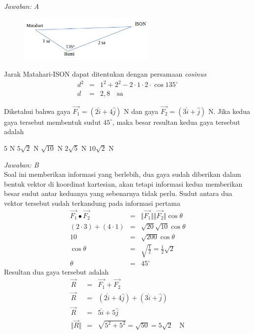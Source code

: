 \documentclass[11pt,fleqn, a4paper]{exam}
\begin{document}
\begin{questions}
\textit{Jawaban: A}
\begin{figure}[H]
\centering
\includegraphics[width=0.6\textwidth]{gambar/osk2016_11.png}
\end{figure}

Jarak Matahari-ISON dapat ditentukan dengan persamaan \textit{cosinus}
\begin{eqnarray*}
d^2 &=& 1^2 + 2^2 - 2 \cdot 1 \cdot 2 \cdot \cos{135^{\circ}}\\
d &=& 2,8 \quad \text{sa} 
\end{eqnarray*}

\vspace{0.5cm}
\question Diketahui bahwa gaya $\overrightarrow{F_1} = (2\hat{i} + 4\hat{j})$ N dan gaya $\overrightarrow{F_2} = (3\hat{i} + \hat{j})$ N. Jika kedua gaya tersebut membentuk sudut $45^{\circ}$, maka besar resultan kedua gaya tersebut adalah
\begin{choices}
\choice $5 $ N
\choice $5 \sqrt{2} $ N
\choice $\sqrt{10} $ N
\choice $2 \sqrt{5} $ N
\choice $10 \sqrt{2} $ N
\end{choices}

\textit{Jawaban: B}\\
Soal ini memberikan informasi yang berlebih, dua gaya sudah diberikan dalam bentuk vektor di koordinat kartesian, akan tetapi informasi kedua memberikan besar sudut antar keduanya yang sebenarnya tidak perlu.
Sudut antara dua vektor tersebut sudah terkandung pada informasi pertama
\begin{eqnarray*}
\overrightarrow{F_1} \bullet \overrightarrow{F_2} &=& \Vert \overrightarrow{F_1} \Vert \Vert \overrightarrow{F_2} \Vert \cos{\theta}\\
(2 \cdot 3) + (4 \cdot 1) &=& \sqrt{20} \sqrt{10} \cos{\theta}\\
10 &=& \sqrt{200} \cos{\theta}\\
\cos{\theta} &=& \sqrt{\frac{1}{2}} = \frac{1}{2} \sqrt{2}\\
\theta &=& 45^{\circ}
\end{eqnarray*}
Resultan dua gaya tersebut adalah
\begin{eqnarray*}
\overrightarrow{R} &=& \overrightarrow{F_1} + \overrightarrow{F_2}\\
\overrightarrow{R} &=& (2\hat{i} + 4\hat{j}) + (3\hat{i} + \hat{j})\\
\overrightarrow{R} &=& 5\hat{i} + 5\hat{j}\\
\Vert \overrightarrow{R} \Vert &=& \sqrt{5^2 + 5^2} = \sqrt{50} = 5\sqrt{2} \quad \text{N}
\end{eqnarray*}


\end{questions}
\end{document}
